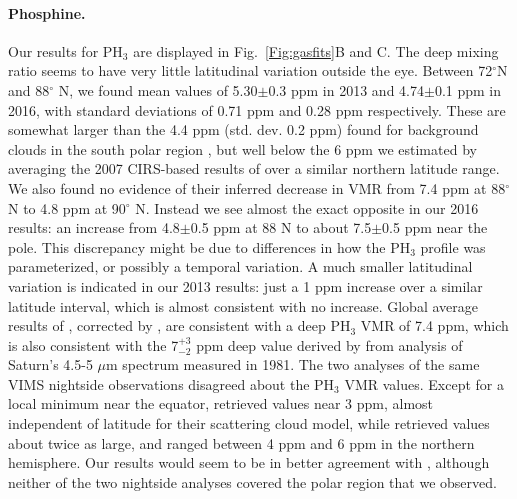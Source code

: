\documentclass[article,11pt]{emulateapj}
\def\deg{$^\circ$ }
\def\degx{$^\circ$}
\def\mum{$\mu$m }
\def\pht{PH$_3$ }
\begin{document}
\paragraph{Phosphine.} Our results for \pht are displayed in Fig.\ \ref{Fig:gasfits}B and C.
The deep mixing ratio seems to have very little latitudinal variation
outside the eye. Between 72\degx N and 88\deg N, we found mean values
of 5.30$\pm$0.3 ppm in 2013 and 4.74$\pm$0.1 ppm in 2016, with
standard deviations of 0.71 ppm and 0.28 ppm respectively. These are
somewhat larger than the 4.4 ppm (std. dev.  0.2 ppm) found for
background clouds in the south polar region \citep{Sro2020spole}, but
well below the 6 ppm we estimated by averaging the 2007 CIRS-based results of
\cite{Fletcher2008} over a similar northern latitude range.  We also found no evidence of their
inferred decrease in VMR from 7.4 ppm at 88\deg N to 4.8 ppm at 90\deg
N.  Instead we see almost the exact opposite in our 2016 results: an
increase from 4.8$\pm$0.5 ppm at 88 N to about 7.5$\pm$0.5 ppm near
the pole. This discrepancy might be due to differences in how the \pht
profile was parameterized, or possibly a temporal variation.  A much
smaller latitudinal variation is indicated in our 2013 results: just a
1 ppm increase over a similar latitude interval, which is almost
consistent with no increase.  Global average results of
\cite{Orton2000ph3}, corrected by \cite{Orton2001ph3}, are consistent
with a deep \pht VMR of 7.4 ppm, which is also consistent with the
7$^{+3}_{-2}$ ppm deep value derived by \cite{Noll1991} from analysis
of Saturn's 4.5-5 \mum spectrum measured in 1981.  The two analyses
of the same VIMS nightside observations disagreed about the \pht VMR
values. Except for a local minimum near the equator, \cite{Fletcher2011vims} 
retrieved values near 3 ppm, almost independent of latitude for their
scattering cloud model, while \cite{Barstow2016} retrieved values about twice
as large, and ranged between 4 ppm and 6 ppm in the northern
hemisphere.  Our results would seem to be in better agreement
with \cite{Barstow2016}, although neither of the two nightside
analyses covered the polar region that we observed.
\end{document}
